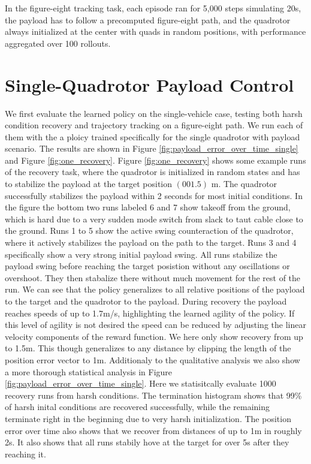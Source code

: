 In the figure-eight tracking task, each episode ran for 5,000 steps simulating 20s, the payload has to follow a precomputed figure-eight path, and the quadrotor always initialized at the center with quads in random positions, with performance aggregated over 100 rollouts. 


\section{Single-Quadrotor Payload Control}
We first evaluate the learned policy on the single-vehicle case, testing both harsh condition recovery and trajectory tracking on a figure-eight path. We run each of them with the a ploicy trained specifically for the single quadrotor with payload scenario. The results are shown in Figure \ref{fig:payload_error_over_time_single} and Figure \ref{fig:one_recovery}.
Figure \ref{fig:one_recovery} shows some example runs of the recovery task, where the quadrotor is initialized in random states and has to stabilize the payload at the target position $(0 0 1.5)$ m. The quadrotor successfully stabilizes the payload within 2 seconds for most initial conditions. In the figure the bottom two runs labeled 6 and 7 show takeoff from the ground, which is hard due to a very sudden mode switch from slack to taut cable close to the ground. Runs 1 to 5 show the active swing counteraction of the quadrotor, where it actively stabilizes the payload on the path to the target. Runs 3 and 4 specifically show a very strong initial payload swing. All runs stabilize the payload swing before reaching the target posistion without any oscillations or overshoot. They then stabalize there without much movement for the rest of the run. We can see that the policy generalizes to all relative positions of the payload to the target and the quadrotor to the payload. During recovery the payload reaches speeds of up to 1.7m/s, highlighting the learned agility of the policy. If this level of agility is not desired the speed can be reduced by adjusting the linear velocity components of the reward function.
We here only show recovery from up to 1.5m. This though generalizes to any distance by clipping the length of the position error vector to 1m. 
Additionaly to the qualitative analysis we also show a more thorough statistical analysis in Figure \ref{fig:payload_error_over_time_single}. Here we statisitcally evaluate 1000 recovery runs from harsh conditions. The termination histogram shows that 99\% of harsh inital conditions are recovered successfully, while the remaining terminate right in the beginning due to very harsh initialization. The position error over time also shows that we recover from distances of up to 1m in roughly 2s. It also shows that all runs stabily hove at the target for over 5s after they reaching it.

